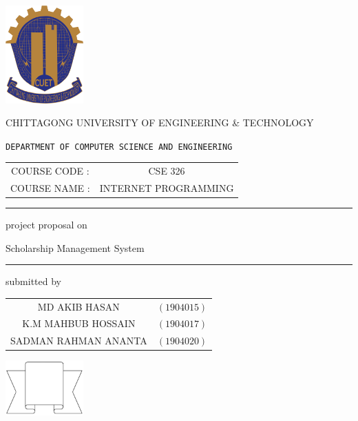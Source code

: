 \documentclass[a4paper,12pt]{report}
\begin{document}
\begin{titlepage}
	\scshape
	\centering

	\includegraphics[width=3cm, keepaspectratio]{cuet.png} \par \vspace{0.1cm}
	\begin{Large}
		CHITTAGONG UNIVERSITY OF ENGINEERING \& TECHNOLOGY
	\end{Large}
	\par
	\texttt{DEPARTMENT OF COMPUTER SCIENCE AND ENGINEERING}
	\vspace{2cm}

	\begin{tabular}{cc}
		COURSE CODE : & CSE 326              \\
		COURSE NAME : & INTERNET PROGRAMMING
	\end{tabular}
	\vspace{1cm}

	\raisebox{-\baselineskip}{\rule{\textwidth}{1px}}
	\rule{\textwidth}{1px}

	\vspace{0.2cm}
	{\Large{{project proposal on}}}\par \vspace{0.5cm}
	\huge{{Scholarship Management System }}
	\rule{\textwidth}{2px}

	\vspace{2cm}
	\normalsize

	\parbox[l]{9cm}{
		\begin{center}
			submitted by
		\end{center}

		\begin{tabular}{cl}
			MD AKIB HASAN        & $(1904015)$ \\
			K.M MAHBUB HOSSAIN   & $(1904017)$ \\
			SADMAN RAHMAN ANANTA & $(1904020)$ \\
		\end{tabular}
	}
	\parbox[r]{7cm}{
		\vspace{1cm}
		\begin{center}
			\includegraphics[width=3cm, keepaspectratio]{remarks.png}
		\end{center}
	}


\end{titlepage}
\end{document}
